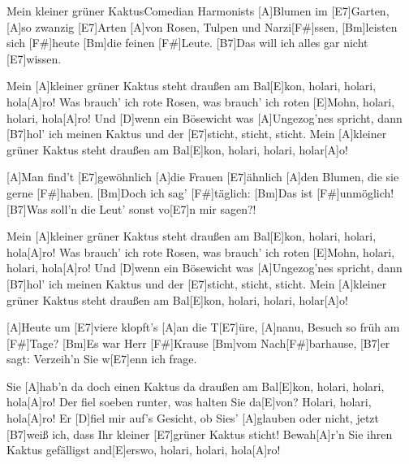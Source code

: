\documentclass[../main.tex]{subfiles}
\begin{document}
\begin{song}{Mein kleiner grüner Kaktus}{Comedian Harmonists}{}
[A]Blumen im [E7]Garten, [A]so zwanzig [E7]Arten
[A]von Rosen, Tulpen und Narzi[F#]ssen,
[Bm]leisten sich [F#]heute [Bm]die feinen [F#]Leute.
[B7]Das will ich alles gar nicht [E7]wissen.

Mein [A]kleiner grüner Kaktus steht draußen am Bal[E]kon, holari, holari, hola[A]ro!
Was brauch’ ich rote Rosen, was brauch’ ich roten [E]Mohn, holari, holari, hola[A]ro!
Und [D]wenn ein Bösewicht was [A]Ungezog’nes spricht,
dann [B7]hol’ ich meinen Kaktus und der [E7]sticht, sticht, sticht.
Mein [A]kleiner grüner Kaktus steht draußen am Bal[E]kon, holari, holari, holar[A]o!

[A]Man find’t [E7]gewöhnlich [A]die Frauen [E7]{ä}hnlich
[A]den Blumen, die sie gerne [F#]haben.
[Bm]Doch ich sag’ [F#]täglich: [Bm]Das ist [F#]unmöglich!
[B7]Was soll’n die Leut’ sonst vo[E7]n mir sagen?!

Mein [A]kleiner grüner Kaktus steht draußen am Bal[E]kon, holari, holari, hola[A]ro!
Was brauch’ ich rote Rosen, was brauch’ ich roten [E]Mohn, holari, holari, hola[A]ro!
Und [D]wenn ein Bösewicht was [A]Ungezog’nes spricht,
dann [B7]hol’ ich meinen Kaktus und der [E7]sticht, sticht, sticht.
Mein [A]kleiner grüner Kaktus steht draußen am Bal[E]kon, holari, holari, holar[A]o!

[A]Heute um [E7]viere klopft’s [A]an die T[E7]{ü}re,
[A]nanu, Besuch so früh am [F#]Tage?
[Bm]Es war Herr [F#]Krause [Bm]vom Nach[F#]barhause,
[B7]er sagt: Verzeih’n Sie w[E7]enn ich frage.

Sie [A]hab’n da doch einen Kaktus da draußen am Bal[E]kon, holari, holari, hola[A]ro!
Der fiel soeben runter, was halten Sie da[E]von? Holari, holari, hola[A]ro!
Er [D]fiel mir auf’s Gesicht, ob Sies’ [A]glauben oder nicht,
jetzt [B7]weiß ich, dass Ihr kleiner [E7]grüner Kaktus sticht!
Bewah[A]r’n Sie ihren Kaktus gefälligst and[E]erswo, holari, holari, hola[A]ro!
\end{song}
\end{document}
